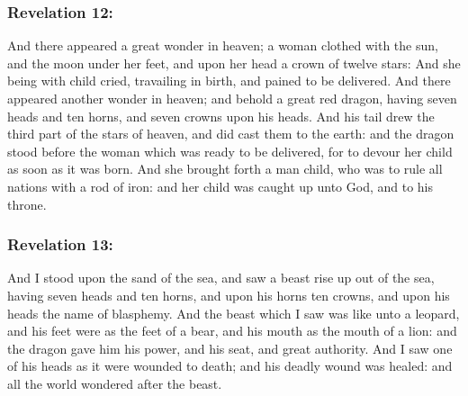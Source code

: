 \subsubsection*{Revelation 12:}
And there appeared a great wonder in heaven; a woman clothed with the sun, and the moon under her feet, and upon her
head a crown of twelve stars: And she being with child cried, travailing in birth, and pained to be delivered. And
there appeared another wonder in heaven; and behold a great red dragon, having seven heads and ten horns, and seven
crowns upon his heads. And his tail drew the third part of the stars of heaven, and did cast them to the earth: and the
dragon stood before the woman which was ready to be delivered, for to devour her child as soon as it was born. And she
brought forth a man child, who was to rule all nations with a rod of iron: and her child was caught up unto God, and to
his throne.

\subsubsection*{Revelation 13:}
And I stood upon the sand of the sea, and saw a beast rise up out of the sea, having seven heads and ten horns, and upon
his horns ten crowns, and upon his heads the name of blasphemy. And the beast which I saw was like unto a leopard, and
his feet were as the feet of a bear, and his mouth as the mouth of a lion: and the dragon gave him his power, and his
seat, and great authority. And I saw one of his heads as it were wounded to death; and his deadly wound was healed: and
all the world wondered after the beast.

